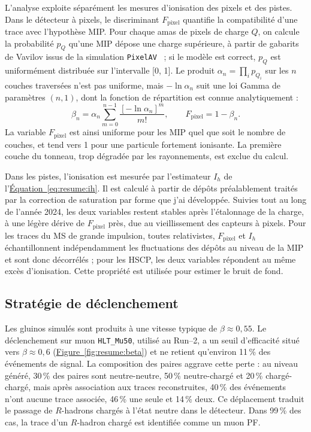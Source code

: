 L'analyse exploite séparément les mesures d'ionisation des pixels et des pistes. Dans le détecteur à pixels, le discriminant $F_\mathrm{pixel}$ quantifie la compatibilité d'une trace avec l'hypothèse MIP. Pour chaque amas de pixels de charge $Q$, on calcule la probabilité $p_Q$ qu'une MIP dépose une charge supérieure, à partir de gabarits de Vavilov issus de la simulation \texttt{PixelAV}~\cite{1495807} ; si le modèle est correct, $p_Q$ est uniformément distribuée sur l'intervalle [0, 1]. Le produit $\displaystyle \alpha_n=\prod_i p_{Q_i}$ sur les $n$ couches traversées n'est pas uniforme, mais $-\ln\alpha_n$ suit une loi Gamma de paramètres $(n,1)$, dont la fonction de répartition est connue analytiquement :
\begin{equation}
    \beta_n=\alpha_n\sum_{m=0}^{n-1}\frac{\left[-\ln\alpha_n\right]^m}{m!} ,
    \qquad
    F_\mathrm{pixel}=1-\beta_n .
\end{equation}
La variable $F_\mathrm{pixel}$ est ainsi uniforme pour les MIP quel que soit le nombre de couches, et tend vers 1 pour une particule fortement ionisante. La première couche du tonneau, trop dégradée par les rayonnements, est exclue du calcul.

Dans les pistes, l'ionisation est mesurée par l'estimateur $I_h$ de l'\hyperref[eq:resume:ih]{\'Equation~\ref*{eq:resume:ih}}. Il est calculé à partir de dépôts préalablement traités par la correction de saturation par forme que j'ai développée. Suivies tout au long de l'année 2024, les deux variables restent stables après l'étalonnage de la charge, à une légère dérive de $F_\mathrm{pixel}$ près, due au vieillissement des capteurs à pixels. Pour les traces du MS de grande impulsion, toutes relativistes, $F_\mathrm{pixel}$ et $I_h$ échantillonnent indépendamment les fluctuations des dépôts au niveau de la MIP et sont donc décorrélés ; pour les HSCP, les deux variables répondent au même excès d'ionisation. Cette propriété est utilisée pour estimer le bruit de fond.

\subsection{Stratégie de déclenchement}

Les gluinos simulés sont produits à une vitesse typique de $\beta\approx0{,}55$. Le déclenchement sur muon \texttt{HLT\_Mu50}, utilisé au Run--2, a un seuil d'efficacité situé vers $\beta\approx0{,}6$ (\hyperref[fig:resume:beta]{Figure~\ref*{fig:resume:beta}}) et ne retient qu'environ 11\,\% des événements de signal. La composition des paires aggrave cette perte : au niveau généré, 30\,\% des paires sont neutre-neutre, 50\,\% neutre-chargé et 20\,\% chargé-chargé, mais après association aux traces reconstruites, 40\,\% des événements n'ont aucune trace associée, 46\,\% une seule et 14\,\% deux. Ce déplacement traduit le passage de $R$-hadrons chargés à l'état neutre dans le détecteur. Dans 99\,\% des cas, la trace d'un $R$-hadron chargé est identifiée comme un muon PF.

